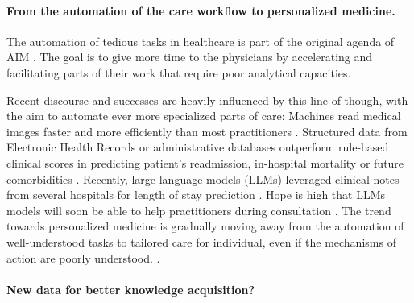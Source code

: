 \documentclass[french,12pt,twoside,a4paper]{book}
\begin{document}

\paragraph{From the automation of the care workflow to personalized medicine.}

The automation of tedious tasks in healthcare is part of the original agenda of
AIM \citep{schwartz1987artificial}. The goal is to give more time to the
physicians by accelerating and facilitating parts of their work that require
poor analytical capacities.

Recent discourse and successes are heavily influenced by this line of though,
with the aim to automate ever more specialized parts of care: Machines read
medical images faster and more efficiently than most practitioners
\citep{zhou2021review}. Structured data from Electronic Health Records
\citep{rajkomar2018scalable} or administrative databases
\citep{beaulieu2021machine} outperform rule-based clinical scores in predicting
patient's readmission, in-hospital mortality or future comorbidities
\citep{li2020behrt}. Recently, large language models (LLMs) leveraged clinical
notes from several hospitals for length of stay prediction
\citep{jiang2023health}. Hope is high that LLMs models will soon be able to help
practitioners during consultation \citep{lee2023benefits}. The trend towards
personalized medicine is gradually moving away from the automation of
well-understood tasks to tailored care for individual, even if the
mechanisms of action are poorly understood.
\citep{schork2015personalized, topol2019high}.

\paragraph{New data for better knowledge acquisition?}
\end{document}

